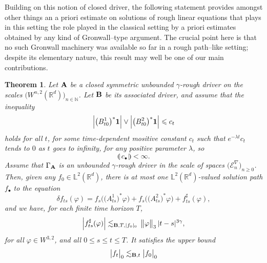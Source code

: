 \documentclass[11pt,a4paper]{amsart}
\newcommand{\NN}{\mathbb{N}}  \newcommand{\ZZ}{\mathbb{Z}}  \newcommand{\QQ}{\mathbb{Q}}  \newcommand{\HH}{\mathbb{H}}
\newcommand{\RR}{\mathbb{R}}  \newcommand{\CC}{\mathbb{C}}  \newcommand{\LL}{\mathbb{L}}  \newcommand{\WW}{\mathbb{W}}
\newcommand{\mcE}{\mathcal{E}}
\renewcommand{\leq}{\leqslant}
\renewcommand{\geq}{\geqslant}
\newcommand{\ssk}{\smallskip}
\newtheorem{thm}{\hspace{-0.15cm}  {\sc Theorem} } %
\numberwithin{equation}{section} %
\begin{document}
\medskip

Building on this notion of closed driver, the following statement provides amongst other things an a priori estimate on solutions of rough linear equations that plays in this setting the role played in the classical setting by a priori estimates obtained by any kind of Gronwall--type argument. The crucial point here is that no such Gronwall machinery was available so far in a rough path--like setting; despite its elementary nature, this result may well be one of our main contributions. 

\ssk

\begin{thm}
\label{ThmRDEHilbertGeneralClosed}
Let $\bf A$ be a \emph{closed symmetric} unbounded $\gamma$-rough driver on the scales $\big(W^{n,2}(\RR^d)\big)_{n\in\NN}$. Let $\bf B$ be its associated driver, and assume that the inequality
\begin{equation}
\label{BoundPhi}
\Big|\big(B^1_{t0}\big)^*{\bf 1} \Big| \vee \Big|\big(B^2_{t0}\big)^*{\bf 1} \Big| \leq c_t
\end{equation}
holds for all $t$, for some time-dependent mositive constant $c_t$ such that $e^{-\lambda t}c_t$ tends to $0$ as $t$ goes to infinity, for any positive parameter $\lambda$, so
$$
\llparenthesis\,c_\bullet\,\rrparenthesis < \infty.
$$
Assume that $\Gamma_{\bf A}$ is an unbounded $\gamma$-rough driver in the scale of spaces $\big(\mcE^\nabla_n\big)_{n\geq 0}$. Then, given any $f_0\in\LL^2(\RR^d)$, there is at most one $\LL^2(\RR^d)$-valued solution path $f_\bullet$ to the equation
\begin{equation}
\label{EqLinearRDEHilbert}
\delta f_{ts}(\varphi) = f_s\Big(\big(A^1_{ts}\big)^*\varphi\Big) + f_s\Big(\big(A^2_{ts}\big)^*\varphi\Big) + f^\sharp_{ts}(\varphi),
\end{equation}
and we have, for each finite time horizon $T$, 
\begin{equation}
\label{EqBoundRemainder}
\Big| f^\sharp_{ts}(\varphi) \Big| \lesssim_{{\bf B},T, | f_0|_0}\,\big\|\varphi\big\|_3\,|t-s|^{3\gamma},
\end{equation}
for all $\varphi\in W^{3,2}$, and all $0\leq s\leq t\leq T$. It satisfies the upper bound
\begin{equation}
\label{EqAPrioriBoundNorm}
\big| f_t\big|_0\lesssim_{{\bf B}, t} \big| f_0\big|_0
\end{equation}
\end{thm}

\ssk
 
\end{document}
